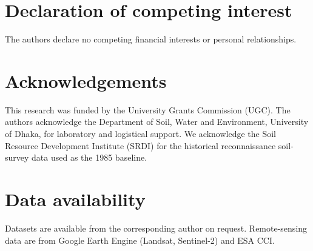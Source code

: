 \documentclass[preprint,authoryear,12pt]{elsarticle}
\begin{document}
\section*{Declaration of competing interest}
The authors declare no competing financial interests or personal relationships.

\section*{Acknowledgements}
This research was funded by the University Grants Commission (UGC). The authors acknowledge
the Department of Soil, Water and Environment, University of Dhaka, for laboratory and
logistical support. We acknowledge the Soil Resource Development Institute (SRDI) for the
historical reconnaissance soil-survey data used as the 1985 baseline.

\section*{Data availability}
Datasets are available from the corresponding author on request. Remote-sensing data are from
Google Earth Engine (Landsat, Sentinel-2) and ESA CCI.



\end{document}
